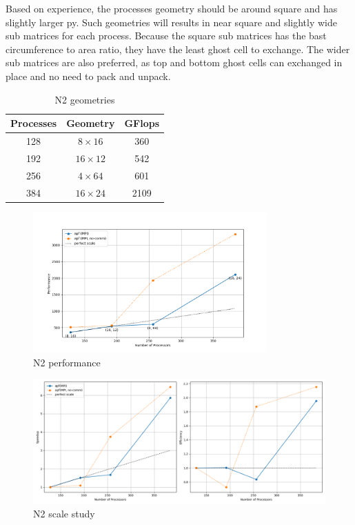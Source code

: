 \documentclass[12pt]{article}
\begin{document}
Based on experience, the processes geometry should be around square and has slightly larger py.
Such geometries will results in near square and slightly wide sub matrices for each process.
Because the square sub matrices has the bast circumference to area ratio, 
they have the least ghost cell to exchange.
The wider sub matrices are also preferred, 
as top and bottom ghost cells can exchanged in place and no need to pack and unpack.

\begin{table}[h!]
\centering
\begin{tabular}{|c|c|c|}
\hline
\textbf{Processes} & \textbf{Geometry} & \textbf{GFlops} \\
\hline
128 & $8 \times 16$ & 360 \\
192 & $16 \times 12$ & 542 \\
256 & $4 \times 64$ & 601 \\
384 & $16 \times 24$ & 2109 \\
\hline
\end{tabular}
\caption{N2 geometries}
\label{tab:N2}
\end{table}

\begin{figure}[h]
    \centering
    \includegraphics[width=0.8\textwidth]{img/N2.png}
    \caption{N2 performance}
    \label{fig:N2}
\end{figure}

\begin{figure}[h]
    \centering
    \includegraphics[width=\textwidth]{img/N2_scale.png}
    \caption{N2 scale study}
    \label{fig:N2-scale}
\end{figure}
\end{document}
